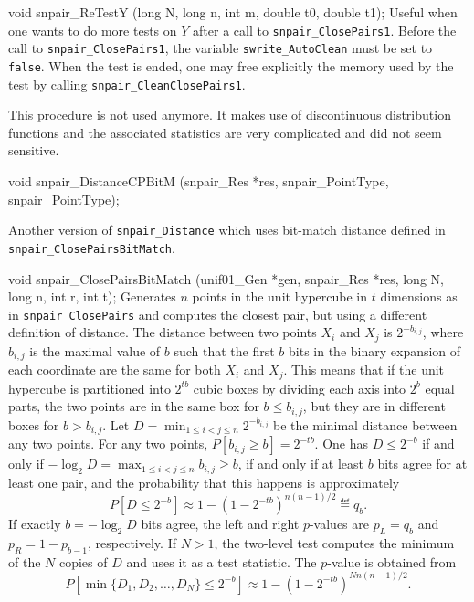 void snpair_ReTestY (long N, long n, int m, double t0, double t1);
\endcode
 \tab Useful when one wants to do more tests on $Y$
   after a call to  {\tt snpair\_ClosePairs1}. Before the call to
   {\tt snpair\_ClosePairs1}, the variable {\tt swrite\_AutoClean} must be
   set to {\tt false}. When the test is ended, one may free explicitly
  the memory used by the test by calling {\tt snpair\_CleanClosePairs1}.

  This procedure is not used anymore. It makes use of discontinuous
  distribution functions and the associated statistics are very
  complicated and did not seem sensitive.
 \endtab
\endhide  %
\ifdetailed  %


\code

void snpair_DistanceCPBitM (snpair_Res *res, snpair_PointType,
                            snpair_PointType);

\endcode
 \tab Another version of {\tt snpair\_Distance} which uses bit-match
  distance defined in {\tt snpair\_Clo\-se\-Pairs\-Bit\-Match}.
\endtab
\fi %
\code


void snpair_ClosePairsBitMatch (unif01_Gen *gen, snpair_Res *res,
                                long N, long n, int r, int t);
\endcode
 \tab  Generates $n$ points in the unit hypercube in $t$ dimensions
   as in {\tt snpair\_ClosePairs} and computes the closest pair,
   but using a different definition of distance.
   The distance between two points $X_i$ and $X_j$ is $2^{-b_{i,j}}$,
   where $b_{i,j}$ is the maximal value of $b$ such that the first
   $b$ bits in the binary expansion of each coordinate are the same
   for both $X_i$ and $X_j$.  This means that if the unit hypercube
   is partitioned into $2^{tb}$ cubic boxes by dividing each axis into
   $2^b$ equal parts, the two points are in the same box for
   $b\le b_{i,j}$, but they are in different boxes for $b > b_{i,j}$.
   Let $D = \min_{1\le i<j\le n} 2^{-b_{i,j}}$ be the minimal distance
   between any two points.
   For any two points, $P[b_{i,j} \ge b] = 2^{-tb}$.
   One has  $D\le 2^{-b}$ if and only if
   $-\log_2 D = \max_{1\le i<j\le n} b_{i,j} \ge b$, if and only if
   at least $b$ bits agree for at least one pair, and the probability
   that this happens is approximately
    $$ P[D\le 2^{-b}] \approx 1 - \left(1 - 2^{-tb}\right)^{n(n-1)/2}
        \eqdef q_b. $$
   If exactly $b = -\log_2 D$ bits agree, the left and right $p$-values
   are $p_L = q_b$ and $p_R = 1 - p_{b-1}$, respectively.
   If $N>1$, the two-level test computes the minimum of the $N$ copies
   of $D$ and uses it as a test statistic. The $p$-value is obtained from
   $$
   P[\min\{D_1, D_2, \ldots, D_N\} \le 2^{-b}]
     \approx 1 - \left(1 - 2^{-tb}\right)^{Nn(n-1)/2}.
   $$
 \endtab

